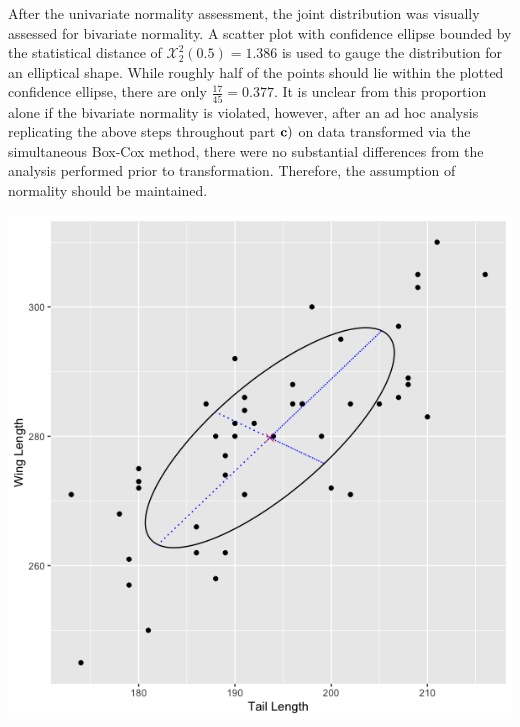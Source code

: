 \begin{enumerate}
	After the univariate normality assessment, the joint distribution was visually assessed for bivariate normality. A scatter plot with confidence ellipse bounded by the statistical distance of $\mathcal{X}_2^2(0.5)=1.386$ is used to gauge the distribution for an elliptical shape. While roughly half of the points should lie within the plotted confidence ellipse, there are only $\frac{17}{45}=0.377$. It is unclear from this proportion alone if the bivariate normality is violated, however, after an ad hoc analysis replicating the above steps throughout part $\bf{c)}$ on data transformed via the simultaneous Box-Cox method, there were no substantial differences from the analysis performed prior to transformation. Therefore, the assumption of normality should be maintained.

	\begin{center}
		\includegraphics[width=6in]{plot_5_20_c_X1X2.png}
	\end{center}

	
\end{enumerate}



